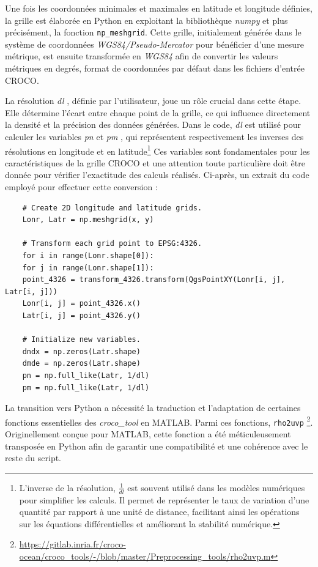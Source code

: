 Une fois les coordonnées minimales et maximales en latitude et longitude définies, la grille est élaborée en Python en exploitant la bibliothèque \textit{numpy} et plus précisément, la fonction \texttt{np\_meshgrid}. Cette grille, initialement générée dans le système de coordonnées \textit{WGS84/Pseudo-Mercator} pour bénéficier d'une mesure métrique, est ensuite transformée en \textit{WGS84} afin de convertir les valeurs métriques en degrés, format de coordonnées par défaut dans les fichiers d'entrée CROCO.

La résolution \og \textit{dl} \fg{}, définie par l'utilisateur, joue un rôle crucial dans cette étape. Elle détermine l'écart entre chaque point de la grille, ce qui influence directement la densité et la précision des données générées. Dans le code, \og \textit{dl} \fg{} est utilisé pour calculer les variables \og \textit{pn} \fg{} et \og \textit{pm} \fg{}, qui représentent respectivement les inverses des résolutions en longitude et en latitude\footnote{L'inverse de la résolution, \( \frac{1}{dl} \) est souvent utilisé dans les modèles numériques pour simplifier les calculs. Il permet de représenter le taux de variation d'une quantité par rapport à une unité de distance, facilitant ainsi les opérations sur les équations différentielles et améliorant la stabilité numérique.}
Ces variables sont fondamentales pour les caractéristiques de la grille CROCO et une attention toute particulière doit être donnée pour vérifier l'exactitude des calculs réalisés. Ci-après, un extrait du code employé pour effectuer cette conversion :

\begin{verbatim}
	# Create 2D longitude and latitude grids.
	Lonr, Latr = np.meshgrid(x, y)

	# Transform each grid point to EPSG:4326.
	for i in range(Lonr.shape[0]):
	for j in range(Lonr.shape[1]):
	point_4326 = transform_4326.transform(QgsPointXY(Lonr[i, j], Latr[i, j]))
	Lonr[i, j] = point_4326.x()
	Latr[i, j] = point_4326.y()

	# Initialize new variables.
	dndx = np.zeros(Latr.shape)
	dmde = np.zeros(Latr.shape)
	pn = np.full_like(Latr, 1/dl)
	pm = np.full_like(Latr, 1/dl)
\end{verbatim}

La transition vers Python a nécessité la traduction et l'adaptation de certaines fonctions essentielles des \textit{croco\_tool} en MATLAB. Parmi ces fonctions, \texttt{rho2uvp} \footnote{\url{https://gitlab.inria.fr/croco-ocean/croco_tools/-/blob/master/Preprocessing_tools/rho2uvp.m}}. Originellement conçue pour MATLAB, cette fonction a été méticuleusement transposée en Python afin de garantir une compatibilité et une cohérence avec le reste du script.

